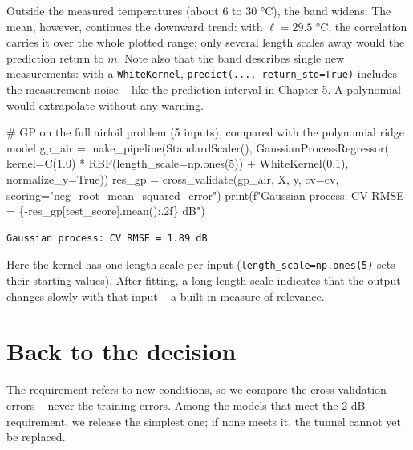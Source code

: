 \documentclass[
  letterpaper,
  DIV=11,
  numbers=noendperiod]{scrreprt}
\newenvironment{Shaded}{\begin{snugshade}}{\end{snugshade}}
\newcommand{\BuiltInTok}[1]{\textcolor[rgb]{0.00,0.23,0.31}{#1}}
\newcommand{\CommentTok}[1]{\textcolor[rgb]{0.37,0.37,0.37}{#1}}
\newcommand{\DecValTok}[1]{\textcolor[rgb]{0.68,0.00,0.00}{#1}}
\newcommand{\FloatTok}[1]{\textcolor[rgb]{0.68,0.00,0.00}{#1}}
\newcommand{\NormalTok}[1]{\textcolor[rgb]{0.00,0.23,0.31}{#1}}
\newcommand{\OperatorTok}[1]{\textcolor[rgb]{0.37,0.37,0.37}{#1}}
\newcommand{\SpecialCharTok}[1]{\textcolor[rgb]{0.37,0.37,0.37}{#1}}
\newcommand{\SpecialStringTok}[1]{\textcolor[rgb]{0.13,0.47,0.30}{#1}}
\newcommand{\StringTok}[1]{\textcolor[rgb]{0.13,0.47,0.30}{#1}}
\newcommand{\VariableTok}[1]{\textcolor[rgb]{0.07,0.07,0.07}{#1}}
\begin{document}
Outside the measured temperatures (about 6 to 30 °C), the band widens.
The mean, however, continues the downward trend: with \(\ell = 29.5\)
°C, the correlation carries it over the whole plotted range; only
several length scales away would the prediction return to \(m\). Note
also that the band describes single new measurements: with a
\texttt{WhiteKernel}, \texttt{predict(...,\ return\_std=True)} includes
the measurement noise -- like the prediction interval in Chapter 5. A
polynomial would extrapolate without any warning.

\begin{Shaded}
\begin{Highlighting}[]
\CommentTok{\# GP on the full airfoil problem (5 inputs), compared with the polynomial ridge model}
\NormalTok{gp\_air }\OperatorTok{=}\NormalTok{ make\_pipeline(StandardScaler(), GaussianProcessRegressor(}
\NormalTok{    kernel}\OperatorTok{=}\NormalTok{C(}\FloatTok{1.0}\NormalTok{) }\OperatorTok{*}\NormalTok{ RBF(length\_scale}\OperatorTok{=}\NormalTok{np.ones(}\DecValTok{5}\NormalTok{)) }\OperatorTok{+}\NormalTok{ WhiteKernel(}\FloatTok{0.1}\NormalTok{), normalize\_y}\OperatorTok{=}\VariableTok{True}\NormalTok{))}
\NormalTok{res\_gp }\OperatorTok{=}\NormalTok{ cross\_validate(gp\_air, X, y, cv}\OperatorTok{=}\NormalTok{cv, scoring}\OperatorTok{=}\StringTok{"neg\_root\_mean\_squared\_error"}\NormalTok{)}
\BuiltInTok{print}\NormalTok{(}\SpecialStringTok{f"Gaussian process: CV RMSE = }\SpecialCharTok{\{}\OperatorTok{{-}}\NormalTok{res\_gp[}\StringTok{\textquotesingle{}test\_score\textquotesingle{}}\NormalTok{]}\SpecialCharTok{.}\NormalTok{mean()}\SpecialCharTok{:.2f\}}\SpecialStringTok{ dB"}\NormalTok{)}
\end{Highlighting}
\end{Shaded}

\begin{verbatim}
Gaussian process: CV RMSE = 1.89 dB
\end{verbatim}

Here the kernel has one length scale per input
(\texttt{length\_scale=np.ones(5)} sets their starting values). After
fitting, a long length scale indicates that the output changes slowly
with that input -- a built-in measure of relevance.

\section{Back to the decision}\label{back-to-the-decision-5}

The requirement refers to new conditions, so we compare the
cross-validation errors -- never the training errors. Among the models
that meet the 2 dB requirement, we release the simplest one; if none
meets it, the tunnel cannot yet be replaced.
\end{document}
